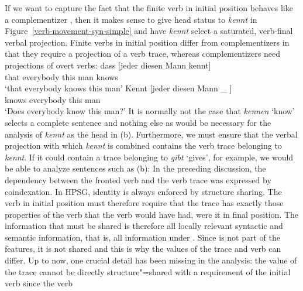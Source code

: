 If we want to capture the fact that the finite verb in initial position behaves like a complementizer \citep{Hoehle97a}, then it makes sense to
give head status to \emph{kennt} in Figure~\ref{verb-movement-syn-simple} and have \emph{kennt} select a saturated, verb-final verbal projection.
Finite verbs in initial position differ from complementizers in that they require a projection of a verb trace, whereas complementizers need projections
of overt verbs:
\eal
\ex 
\gll dass [jeder diesen Mann kennt]\\
     that \spacebr{}everybody this man knows\\
\glt `that everybody knows this man'
\ex 
\gll Kennt [jeder diesen Mann \_ ]\\
	 knows \spacebr{}everybody this man\\
\glt `Does everybody know this man?'
\zl
It is normally not the case that \emph{kennen} `know' selects a complete sentence and nothing else as would be necessary for the analysis of 
\emph{kennt} as the head in (b). Furthermore, we must ensure that the verbal projection with which \emph{kennt} is combined contains the verb trace belonging to
\emph{kennt}. If it could contain a trace belonging to \emph{gibt} `gives', for example, we would be able to analyze sentences such as (b):
\eal
{}
\zl
\addlines
In the preceding discussion, the dependency between the fronted verb and the verb trace was expressed by coindexation. In HPSG, identity is always
enforced by structure sharing. The verb in initial position must therefore require that the trace
has exactly those properties of the verb that the verb would have had, were it in final
position. The information that must be shared is therefore all locally relevant syntactic and
semantic information, that is, all information under \local. Since \phon is not part of the \local features, it is not shared and this is why the \phon values of the trace and verb can
differ. Up to now, one crucial detail has been missing in the analysis: the \local value of the
trace cannot be directly structure"=shared with a requirement of the initial verb since the verb
